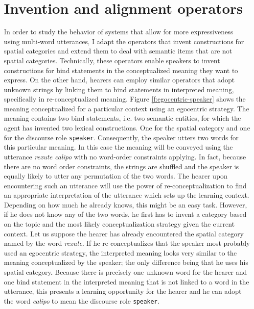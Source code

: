 \section{Invention and alignment operators}
In order to study the behavior of systems that allow for more expressiveness using 
multi-word utterances, I adapt the operators that invent constructions for spatial categories 
and extend them to deal with semantic items that are not spatial categories. 
Technically, these operators enable speakers to invent constructions for bind statements in the 
conceptualized meaning they want to express. On the other hand, hearers can employ 
similar operators that adopt unknown strings by linking them to bind statements in 
interpreted meaning, specifically in re-conceptualized meaning. 
Figure \ref{f:egocentric-speaker} shows the 
meaning conceptualized for a particular context using an egocentric strategy. The
meaning contains two bind statements, i.e. two semantic entities, for which the agent
has invented two lexical constructions. One for the spatial category and
one for the discourse role {\footnotesize\tt speaker}. Consequently, the speaker
utters two words for this particular meaning. In this case the meaning will be conveyed 
using the utterance \textit{rexute calipo} with no word-order constraints applying. 
In fact, because there are no word order constraints, the strings are shuffled and the speaker 
is equally likely to utter any permutation of the two words. The hearer upon encountering such
an utterance will use the power of re-conceptualization to find an appropriate interpretation
of the utterance which sets up the learning context. Depending on how much he already knows, this might be an easy task. However, if he does not know any of the two words, 
he first has to invent a category based on the topic and the most likely conceptualization 
strategy given the current context.
Let us suppose the hearer has already encountered the spatial category named by the 
word \textit{rexute}. If he re-conceptualizes that the speaker most probably used an egocentric
strategy, the interpreted meaning looks very similar to the meaning conceptualized 
by the speaker; the only difference being that he uses his spatial category. 
Because there is precisely one unknown word for the hearer and one 
bind statement in the interpreted meaning
that is not linked to a word in the utterance, this presents a learning opportunity for the
hearer and he can adopt the word \textit{calipo} to mean the discourse role {\footnotesize\tt speaker}.

